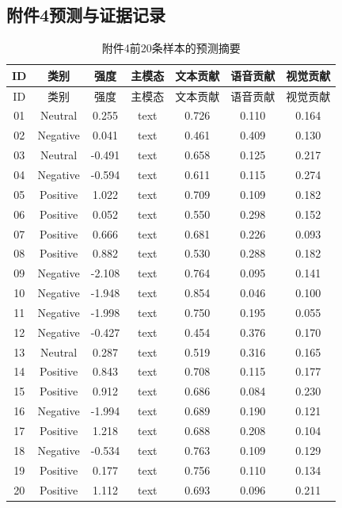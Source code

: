 \documentclass{gmcmthesis}
\begin{document}
\begin{appendices}
\subsection{附件4预测与证据记录}
\begin{longtable}{ccccccc}
\caption{附件4前20条样本的预测摘要}\label{tab:attachment4_records}\\
\toprule ID & 类别 & 强度 & 主模态 & 文本贡献 & 语音贡献 & 视觉贡献 \\
\midrule
\endfirsthead
\toprule ID & 类别 & 强度 & 主模态 & 文本贡献 & 语音贡献 & 视觉贡献 \\
\midrule
\endhead
01 & Neutral & 0.255 & text & 0.726 & 0.110 & 0.164 \\
02 & Negative & 0.041 & text & 0.461 & 0.409 & 0.130 \\
03 & Neutral & -0.491 & text & 0.658 & 0.125 & 0.217 \\
04 & Negative & -0.594 & text & 0.611 & 0.115 & 0.274 \\
05 & Positive & 1.022 & text & 0.709 & 0.109 & 0.182 \\
06 & Positive & 0.052 & text & 0.550 & 0.298 & 0.152 \\
07 & Positive & 0.666 & text & 0.681 & 0.226 & 0.093 \\
08 & Positive & 0.882 & text & 0.530 & 0.288 & 0.182 \\
09 & Negative & -2.108 & text & 0.764 & 0.095 & 0.141 \\
10 & Negative & -1.948 & text & 0.854 & 0.046 & 0.100 \\
11 & Negative & -1.998 & text & 0.750 & 0.195 & 0.055 \\
12 & Negative & -0.427 & text & 0.454 & 0.376 & 0.170 \\
13 & Neutral & 0.287 & text & 0.519 & 0.316 & 0.165 \\
14 & Positive & 0.843 & text & 0.708 & 0.115 & 0.177 \\
15 & Positive & 0.912 & text & 0.686 & 0.084 & 0.230 \\
16 & Negative & -1.994 & text & 0.689 & 0.190 & 0.121 \\
17 & Positive & 1.218 & text & 0.688 & 0.208 & 0.104 \\
18 & Negative & -0.534 & text & 0.763 & 0.109 & 0.129 \\
19 & Positive & 0.177 & text & 0.756 & 0.110 & 0.134 \\
20 & Positive & 1.112 & text & 0.693 & 0.096 & 0.211 \\
\bottomrule
\end{longtable}

\end{appendices}
\end{document}
